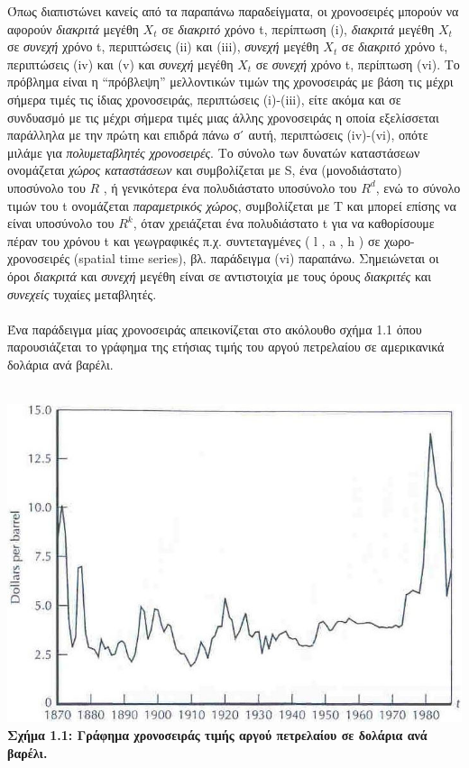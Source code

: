 Όπως διαπιστώνει κανείς από τα παραπάνω παραδείγματα, οι χρονοσειρές μπορούν
να αφορούν \textit{διακριτά} μεγέθη $ X_t $ σε \textit{διακριτό} χρόνο t, περίπτωση (i), \textit{διακριτά} μεγέθη
$ X_t $ σε \textit{συνεχή} χρόνο t, περιπτώσεις (ii) και (iii), \textit{συνεχή} μεγέθη $X_t$ σε \textit{διακριτό} χρόνο t, περιπτώσεις (iv) και (v) και \textit{συνεχή} μεγέθη $X_t$ σε \textit{συνεχή} χρόνο t, περίπτωση (vi).
Το πρόβλημα είναι η “πρόβλεψη” μελλοντικών τιμών της χρονοσειράς με βάση τις
μέχρι σήμερα τιμές τις ίδιας χρονοσειράς, περιπτώσεις (i)-(iii), είτε ακόμα και σε
συνδυασμό με τις μέχρι σήμερα τιμές μιας άλλης χρονοσειράς η οποία εξελίσσεται
παράλληλα με την πρώτη και επιδρά πάνω σ ́ αυτή, περιπτώσεις (iv)-(vi), οπότε
μιλάμε για \textit{πολυμεταβλητές χρονοσειρές}. Το σύνολο των δυνατών καταστάσεων
ονομάζεται \textit{χώρος καταστάσεων} και συμβολίζεται με S, ένα (μονοδιάστατο)
υποσύνολο του  $ R $   , ή γενικότερα ένα πολυδιάστατο υποσύνολο του $ R^d $, ενώ το
σύνολο τιμών του t ονομάζεται \textit{παραμετρικός χώρος}, συμβολίζεται με Τ και μπορεί
επίσης να είναι υποσύνολο του $ R^k $, όταν χρειάζεται ένα πολυδιάστατο t για να
καθορίσουμε πέραν του χρόνου t και γεωγραφικές π.χ. συντεταγμένες ( l , a , h ) σε
χωρο-χρονοσειρές (spatial time series), βλ. παράδειγμα (vi) παραπάνω. Σημειώνεται
οι όροι \textit{διακριτά} και \textit{συνεχή} μεγέθη είναι σε αντιστοιχία με τους όρους \textit{διακριτές} και
\textit{συνεχείς} τυχαίες μεταβλητές. \\ \\
Ένα παράδειγμα μίας χρονοσειράς απεικονίζεται στο ακόλουθο σχήμα 1.1 όπου παρουσιάζεται το γράφημα
της ετήσιας τιμής του αργού πετρελαίου σε αμερικανικά δολάρια ανά βαρέλι. \\ \\
\begin{center}
\includegraphics[scale=0.4]{graf1.png}\\   
\textbf{Σχήμα 1.1: Γράφημα χρονοσειράς τιμής αργού πετρελαίου σε δολάρια ανά βαρέλι.}
\end{center} 
\linespread{1}

